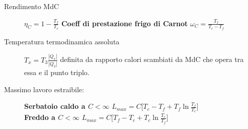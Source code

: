 \documentclass[10pt, oneside]{article}
\begin{document}
\begin{description}
\item[Rendimento MdC] $\boxed{\displaystyle \eta_C = 1 - \frac{T_f}{T_c}}$ \hfill \textbf{Coeff di prestazione frigo di Carnot} $\boxed{\displaystyle \omega_C = \frac{T_f}{T_c - T_f}}$
\item[Temperatura termodinamica assoluta] $\displaystyle T_x = T_3 \frac{|Q_x|}{|Q_3|}$ definita da rapporto calori scambiati da MdC che opera tra essa e il punto triplo.
\item[Massimo lavoro estraibile:] \textbf{Serbatoio caldo a $C < \infty$} $\displaystyle L_{max} = C\bigg[T_c - T_f + T_f \ln \frac{T_f}{T_c}\bigg]$ \\ \textbf{Freddo a $C < \infty$} $\displaystyle L_{max} = C \bigg[T_f - T_c + T_c \ln \frac{T_c}{T_f}\bigg]$
\end{description}
\end{document}
